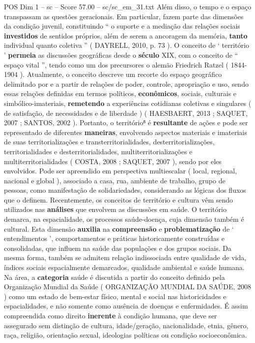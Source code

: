 \begin{textsample}{POS Dim 1 – sc – Score 57.00 – sc/sc\_em\_31.txt}
Além disso, o tempo e o espaço transpassam as questões geracionais.
Em particular, fazem parte das dimensões da condição juvenil, constituindo “ o suporte e a mediação das relações sociais \textbf{investidos} de sentidos próprios, além de serem a ancoragem da memória, \textbf{tanto} individual quanto coletiva ” ( DAYRELL, 2010, p. 73 ).
O conceito de ‘ território ’ \textbf{permeia} as discussões geográficas desde o \textbf{século} XIX, com o conceito de “ espaço vital ”, tendo como um dos precursores o alemão Friedrich Ratzel ( 1844-1904 ).
Atualmente, o conceito descreve um recorte do espaço geográfico delimitado por e a partir de relações de poder, controle, apropriação e uso, sendo essas relações definidas em termos políticos, \textbf{econômicos}, sociais, culturais e simbólico-imateriais, \textbf{remetendo} a experiências cotidianas coletivas e singulares ( de satisfação, de necessidades e de liberdade ) ( HAESBAERT, 2013 ; SAQUET, 2007 ; SANTOS, 2002 ).
Portanto, o território⁸ é \textbf{resultante} de ações e pode ser representado de diferentes \textbf{maneiras}, envolvendo aspectos materiais e imateriais de suas territorializações e transterritorialidades, desterritorializações, territorialidades e desterritorialidades, multiterritorializações e multiterritorialidades ( COSTA, 2008 ; SAQUET, 2007 ), sendo por eles envolvidos.
Pode ser apreendido em perspectiva multiescalar ( local, regional, nacional e global ), associado a casa, rua, ambiente de trabalho, grupo de pessoas, como manifestação de solidariedades, considerando as lógicas dos fluxos que o definem.
Recentemente, os conceitos de território e cultura vêm sendo utilizados nas \textbf{análises} que envolvem as discussões em saúde.
O território demarca, na espacialidade, os processos saúde-doença, cuja dimensão também é cultural.
Esta dimensão \textbf{auxilia} na \textbf{compreensão} e \textbf{problematização} de ‘ entendimentos ’, comportamentos e práticas historicamente construídas e consolidadas, que influem na saúde das populações e dos grupos sociais.
Da mesma forma, também se admitem relação indissociada entre qualidade de vida, índices sociais espacialmente demarcados, qualidade ambiental e saúde humana.
Na área, a \textbf{categoria} saúde é discutida a partir do conceito definido pela Organização Mundial da Saúde ( ORGANIZAÇÃO MUNDIAL DA SAÚDE, 2008 ) como um estado de bem-estar físico, mental e social nas historicidades e espacialidades, e não somente como ausência de doenças e enfermidades.
É assim compreendida como direito \textbf{inerente} à condição humana, que deve ser assegurado sem distinção de cultura, idade/geração, nacionalidade, etnia, gênero, raça, religião, orientação sexual, ideologias políticas ou condição socioeconômica.

\end{textsample}
